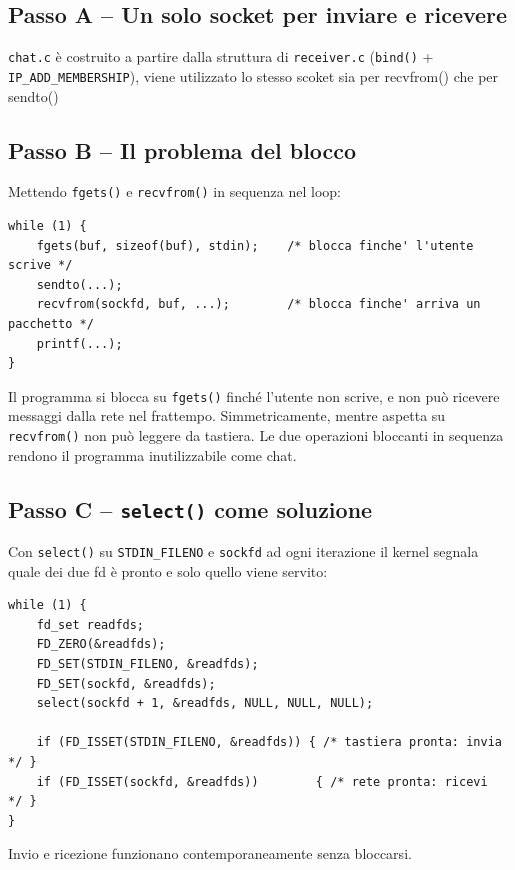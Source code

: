 \documentclass[a4paper,12pt]{article}
\begin{document}
\subsection*{Passo A -- Un solo socket per inviare e ricevere}

\texttt{chat.c} è costruito a partire dalla struttura di \texttt{receiver.c}
(\texttt{bind()} + \texttt{IP\_ADD\_MEMBERSHIP}), viene utilizzato
lo stesso scoket sia per recvfrom() che per sendto()

\subsection*{Passo B -- Il problema del blocco}

Mettendo \texttt{fgets()} e \texttt{recvfrom()} in sequenza nel loop:

\begin{lstlisting}
while (1) {
    fgets(buf, sizeof(buf), stdin);    /* blocca finche' l'utente scrive */
    sendto(...);
    recvfrom(sockfd, buf, ...);        /* blocca finche' arriva un pacchetto */
    printf(...);
}
\end{lstlisting}

Il programma si blocca su \texttt{fgets()} finché l'utente non scrive, e non può
ricevere messaggi dalla rete nel frattempo. Simmetricamente, mentre aspetta su
\texttt{recvfrom()} non può leggere da tastiera. Le due operazioni bloccanti in
sequenza rendono il programma inutilizzabile come chat.

\subsection*{Passo C -- \texttt{select()} come soluzione}

Con \texttt{select()} su \texttt{STDIN\_FILENO} e \texttt{sockfd} ad ogni
iterazione il kernel segnala quale dei due fd è pronto e solo quello 
viene servito:

\begin{lstlisting}
while (1) {
    fd_set readfds;
    FD_ZERO(&readfds);
    FD_SET(STDIN_FILENO, &readfds);
    FD_SET(sockfd, &readfds);
    select(sockfd + 1, &readfds, NULL, NULL, NULL);

    if (FD_ISSET(STDIN_FILENO, &readfds)) { /* tastiera pronta: invia */ }
    if (FD_ISSET(sockfd, &readfds))        { /* rete pronta: ricevi  */ }
}
\end{lstlisting}

Invio e ricezione funzionano contemporaneamente senza bloccarsi.
\end{document}

